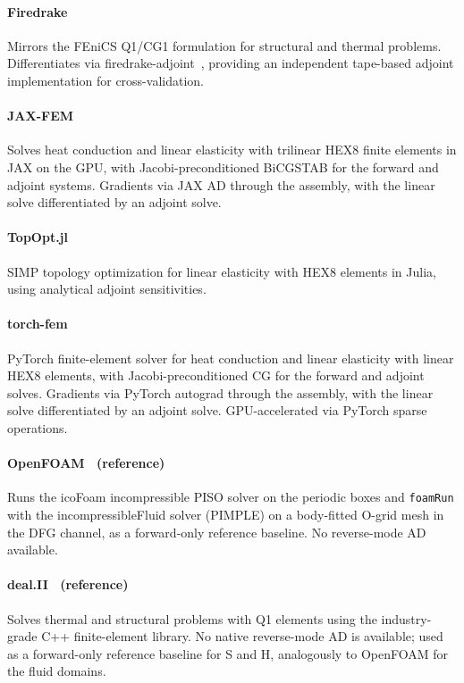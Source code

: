 \paragraph{Firedrake~\cite{rathgeber2016firedrake}}
Mirrors the FEniCS Q1/CG1 formulation for structural and thermal problems.
Differentiates via firedrake-adjoint~\cite{mitusch2019dolfinadjoint}, providing an independent
tape-based adjoint implementation for cross-validation.

\paragraph{JAX-FEM~\cite{xue2023jaxfem}}
Solves heat conduction and linear elasticity with trilinear HEX8 finite
elements in JAX on the GPU, with Jacobi-preconditioned BiCGSTAB for the forward
and adjoint systems. Gradients via JAX AD through the assembly, with the linear
solve differentiated by an adjoint solve.

\paragraph{TopOpt.jl~\cite{huang2021topoptjl}}
SIMP topology optimization for linear elasticity with HEX8 elements in
Julia, using analytical adjoint sensitivities.

\paragraph{torch-fem~\cite{meyer2024torchfem}}
PyTorch finite-element solver for heat conduction and linear elasticity with
linear HEX8 elements, with Jacobi-preconditioned CG for the forward and adjoint
solves. Gradients via PyTorch autograd through the assembly, with the linear
solve differentiated by an adjoint solve.
GPU-accelerated via PyTorch sparse operations.

\paragraph{OpenFOAM~\cite{weller1998tensorial} (reference)}
Runs the icoFoam incompressible PISO solver on the periodic boxes and
\texttt{foamRun} with the incompressibleFluid solver (PIMPLE) on a body-fitted
O-grid mesh in the DFG channel, as a forward-only reference
baseline. No reverse-mode AD available.

\paragraph{deal.II~\cite{bangerth2007dealii,arndt2023dealii} (reference)}
Solves thermal and structural problems with Q1 elements using the
industry-grade C++ finite-element library.
No native reverse-mode AD is available; used as a forward-only reference
baseline for S and H, analogously to OpenFOAM for the fluid domains.

